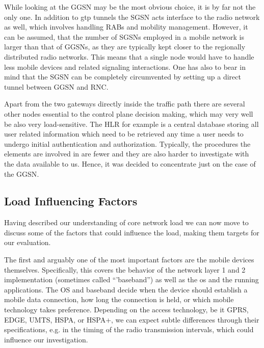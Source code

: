 While looking at the \gls{GGSN} may be the most obvious choice, it is by far not the only one. In addition to \gls{gtp} tunnels the \gls{SGSN} acts interface to the radio network as well, which involves handling \glspl{RAB} and mobility management. However, it can be assumed, that the number of \glspl{SGSN} employed in a mobile network is larger than that of \glspl{GGSN}, as they are typically kept closer to the regionally distributed radio networks. This means that a single node would have to handle less mobile devices and related signaling interactions. One has also to bear in mind that the \gls{SGSN} can be completely circumvented by setting up a direct tunnel between \gls{GGSN} and \gls{RNC}.

Apart from the two gateways directly inside the traffic path there are several other nodes essential to the control plane decision making, which may very well be also very load-sensitive. The \gls{HLR} for example is a central database storing all user related information which need to be retrieved any time a user needs to undergo initial authentication and authorization. Typically, the procedures the elements are involved in are fewer and they are also harder to investigate with the data available to us. Hence, it was decided to concentrate just on the case of the \gls{GGSN}.



\subsection{Load Influencing Factors}

Having described our understanding of core network load we can now move to discuss some of the factors that could influence the load, making them targets for our evaluation.

The first and arguably one of the most important factors are the mobile devices themselves. Specifically, this covers the behavior of the network layer 1 and 2 implementation (sometimes called ``'baseband'') as well as the \gls{os} and the running applications. The OS and baseband decide when the device should establish a mobile data connection, how long the connection is held, or which mobile technology takes preference. Depending on the access technology, be it \acrshort{GPRS}, \acrshort{EDGE}, \acrshort{UMTS}, \acrshort{HSPA}, or \acrshort{HSPA+}, we can expect subtle differences through their specifications, e.g. in the timing of the radio transmission intervals, which could influence our investigation. 

